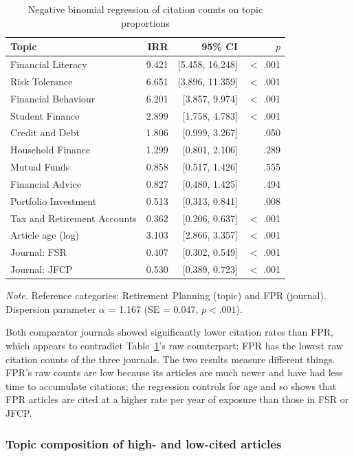 \documentclass[11pt,a4paper]{article}
\newcommand{\tablenote}[1]{\par\smallskip\parbox{\linewidth}{\footnotesize\textit{Note.} #1}}
\begin{document}
\begin{table}[htbp]
\centering
\small
\caption{Negative binomial regression of citation counts on topic proportions}
\label{tab:qb_irr}
\begin{tabular}{lrrr}
\toprule
Topic & IRR & 95\% CI & $p$ \\
\midrule
Financial Literacy & 9.421 & [5.458, 16.248] & $<$ .001 \\
Risk Tolerance & 6.651 & [3.896, 11.359] & $<$ .001 \\
Financial Behaviour & 6.201 & [3.857, 9.974] & $<$ .001 \\
Student Finance & 2.899 & [1.758, 4.783] & $<$ .001 \\
Credit and Debt & 1.806 & [0.999, 3.267] & .050 \\
Household Finance & 1.299 & [0.801, 2.106] & .289 \\
Mutual Funds & 0.858 & [0.517, 1.426] & .555 \\
Financial Advice & 0.827 & [0.480, 1.425] & .494 \\
Portfolio Investment & 0.513 & [0.313, 0.841] & .008 \\
Tax and Retirement Accounts & 0.362 & [0.206, 0.637] & $<$ .001 \\
\midrule
Article age (log) & 3.103 & [2.866, 3.357] & $<$ .001 \\
Journal: FSR & 0.407 & [0.302, 0.549] & $<$ .001 \\
Journal: JFCP & 0.530 & [0.389, 0.723] & $<$ .001 \\
\bottomrule
\end{tabular}
\tablenote{Reference categories: Retirement Planning (topic) and FPR (journal). Dispersion parameter $\alpha$ = 1.167 (SE = 0.047, $p < .001$).}
\end{table}

Both comparator journals showed significantly lower citation rates than FPR, which appears to contradict Table~\ref{tab:qb_irr}'s raw counterpart: FPR has the lowest raw citation counts of the three journals. The two results measure different things. FPR's raw counts are low because its articles are much newer and have had less time to accumulate citations; the regression controls for age and so shows that FPR articles are cited at a higher rate per year of exposure than those in FSR or JFCP.

\subsubsection{Topic composition of high- and low-cited articles}\label{qb-hilo}
\end{document}
